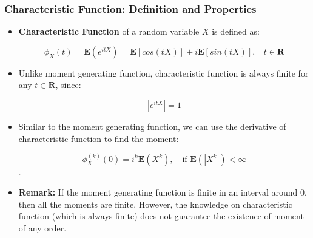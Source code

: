 \documentclass[handout]{beamer}
\newcommand{\BE}{\mathbf{E}}
\begin{document}
\frame
{
  \frametitle{Characteristic Function: Definition and Properties} 

   \begin{itemize}
          
                     
                     \item<1-> \textbf{Characteristic Function} of a random variable $X$ is defined as:
                     
                     $$\phi_X(t)=\BE(e^{itX})=\BE[cos(tX)]+i\BE[sin(tX)], \ \ \ \ t\in \mathbf{R}$$
                     
                     \item<2-> Unlike moment generating function, characteristic function is always finite for any $t\in \mathbf{R}$, since: 
                     
                     $$|e^{itX}|= 1$$
                     
                     \item<3-> Similar to the moment generating function, we can use the derivative of characteristic function to find the moment:
                     
                     $$\phi_X^{(k)}(0)=i^k\BE(X^k),\ \ \ \text{  if  } \BE(|X^k|)<\infty$$.
                     
                     \item<4>[-]\textbf{Remark:} If the moment generating function is finite in an interval around 0, then all the moments are finite. However, the knowledge on characteristic function (which is always finite) does not guarantee the existence of moment of any order. 

                                                                                                   
                                               \end{itemize}
}
\end{document}
